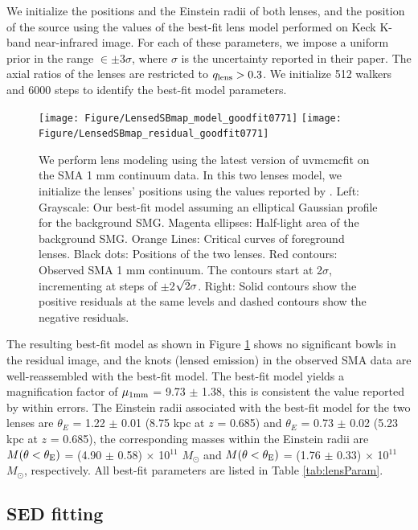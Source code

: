 \documentclass[twocolumn,apj,numberedappendix]{emulateapj}
\newcommand{\Msun}{\mbox{$M_{\odot}$}}
\begin{document}
We initialize the positions and the Einstein radii of both lenses, and the position of the source using the
values of the best-fit lens model \citet{Haas14} performed on Keck K-band near-infrared image. For each of
these parameters, we impose a uniform prior in the range $\in\pm$3$\sigma$, where $\sigma$ is the uncertainty
reported in their paper. The axial ratios of the lenses are restricted to $q_{\rm lens} > 0.3$. We initialize 512
walkers and 6000 steps to identify the best-fit model parameters.
\begin{figure}[!tbpH]
\centering
\texttt{[image: Figure/LensedSBmap\_model\_goodfit0771]}
\texttt{[image: Figure/LensedSBmap\_residual\_goodfit0771]}
\caption{We perform lens modeling using the latest version of {\sc uvmcmcfit} on the SMA 1 mm continuum data.
In this two lenses model, we initialize the lenses' positions using the values reported by \citet{Haas14}. Left:
Grayscale: Our best-fit model assuming an elliptical Gaussian profile for the background SMG. Magenta ellipses:
Half-light area of the background SMG. Orange Lines: Critical curves of foreground lenses. Black dots: Positions of
the two lenses. Red contours: Observed SMA 1 mm continuum. The contours start at 2$\sigma$, incrementing at
steps of $\pm$2$\sqrt{\rm 2}\sigma$. Right: Solid contours show the positive residuals at the same levels and dashed contours
show the negative residuals. \label{fig:lens}}
\end{figure}

The resulting best-fit model as shown in Figure \ref{fig:lens} shows no significant bowls in the residual
image, and the knots (lensed emission) in the observed SMA data are well-reassembled with the best-fit model.
The best-fit model yields a magnification
factor of $\mu_{\rm 1mm}$ = 9.73 $\pm$ 1.38, this is consistent the value reported by \citet{Haas14} within errors. The Einstein radii associated with the best-fit model for the two lenses are $\theta_{E}$ =
1.22 $\pm$ 0.01 (8.75 kpc at $z$ = 0.685) and $\theta_{E}$ = 0.73 $\pm$ 0.02 (5.23 kpc at $z$ = 0.685),
the corresponding masses within the Einstein radii are $M(\theta < \theta_{\rm E})$ = (4.90 $\pm$ 0.58) $\times$ 10$^{11}$ 
\Msun 
and $M(\theta < \theta_{\rm E})$ = (1.76 $\pm$ 0.33) $\times$ 10$^{11}$ \Msun, respectively. All best-fit
parameters are listed in Table \ref{tab:lensParam}.


\subsection{SED fitting} \label{sec:SED}
\end{document}
